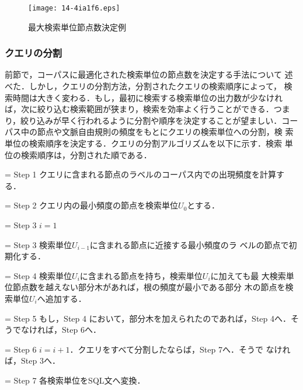 \documentclass[japanese]{jnlp_1.3e}
\begin{document}
\begin{figure}[b]
\begin{center}
\texttt{[image: 14-4ia1f6.eps]}
	\caption{最大検索単位節点数決定例}
    	\label{fig:decograph}
\end{center}
\end{figure}


\subsubsection{クエリの分割}

前節で，コーパスに最適化された検索単位の節点数を決定する手法について
述べた．しかし，クエリの分割方法，分割されたクエリの検索順序によって，
検索時間は大きく変わる．もし，最初に検索する検索単位の出力数が少なけれ
ば，次に絞り込む検索範囲が狭まり，検索を効率よく行うことができる．つま
り，絞り込みが早く行われるように分割や順序を決定することが望ましい．コー
パス中の節点や文脈自由規則の頻度をもとにクエリの検索単位への分割，検
索単位の検索順序を決定する．クエリの分割アルゴリズムを以下に示す．検索
単位の検索順序は，分割された順である．

\newlength{\StepW}\settowidth{\StepW}{Step 9\quad}
\hangindent=\StepW\noindent
    Step 1\quad 
クエリに含まれる節点のラベルのコーパス内での出現頻度を計算する．

\hangindent=\StepW\noindent
    Step 2\quad 
クエリ内の最小頻度の節点を検索単位$U_0$とする．

\hangindent=\StepW\noindent
    Step 3\quad 
$i = 1$

\hangindent=\StepW\noindent
    Step 3\quad 
検索単位$U_{i-1}$に含まれる節点に近接する最小頻度のラ
  ベルの節点で初期化する．

\hangindent=\StepW\noindent
    Step 4\quad 
検索単位$U_{i}$に含まれる節点を持ち，検索単位$U_i$に加えても最
  大検索単位節点数を越えない部分木があれば，根の頻度が最小である部分
  木の節点を検索単位$U_i$へ追加する．

\hangindent=\StepW\noindent
    Step 5\quad 
もし，Step 4 において，部分木を加えられたのであれば，Step 4へ．そうでなければ，Step 6へ．

\hangindent=\StepW\noindent
    Step 6\quad 
$i=i+1$．クエリをすべて分割したならば，Step 7へ．そうで
  なければ，Step 3へ．

\hangindent=\StepW\noindent
    Step 7\quad 
各検索単位をSQL文へ変換．
\end{document}
